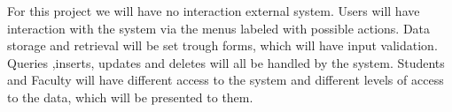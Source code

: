 
For this project we will have no interaction external system. Users will have interaction with the system via the menus labeled with possible actions. Data storage and retrieval will be set trough forms, which will have input validation. 
Queries ,inserts, updates and deletes will all be handled by the system.
Students and Faculty will have different access to the system and different levels of access to the data, which will be presented to them.
